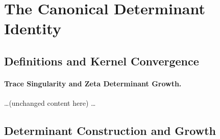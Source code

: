 \section{The Canonical Determinant Identity}
\label{sec:determinant_identity}



\subsection{Definitions and Kernel Convergence}
\label{sec:def_kernel_convergence}












\paragraph{Trace Singularity and Zeta Determinant Growth.}
\ldots (unchanged content here) \ldots

\subsection{Determinant Construction and Growth}
\label{sec:det_growth}













